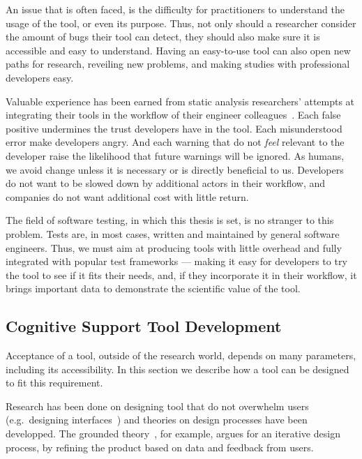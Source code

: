 \documentclass[a4paper,11pt]{sdm_internship}
\theoremstyle{definition}
\begin{document}
An issue that is often faced, is the difficulty for practitioners to understand the usage of the tool, or even its purpose.
Thus, not only should a researcher consider the amount of bugs their tool can detect, they should also make sure it is accessible and easy to understand.
Having an easy-to-use tool can also open new paths for research, reveiling new problems, and making studies with professional developers easy.

Valuable experience has been earned from static analysis researchers' attempts at integrating their tools in the workflow of their engineer colleagues~\cite{bessey2010few,sadowski2015tricorder,sadowski2018lessons}.
Each false positive undermines the trust developers have in the tool.
Each misunderstood error make developers angry.
And each warning that do not \emph{feel} relevant to the developer raise the likelihood that future warnings will be ignored.
As humans, we avoid change unless it is necessary or is directly beneficial to us.
Developers do not want to be slowed down by additional actors in their workflow, and companies do not want additional cost with little return.

The field of software testing, in which this thesis is set, is no stranger to this problem.
Tests are, in most cases, written and maintained by general software engineers.
Thus, we must aim at producing tools with little overhead and fully integrated with popular test frameworks --- making it easy for developers to try the tool to see if it fits their needs, and, if they incorporate it in their workflow, it brings important data to demonstrate the scientific value of the tool.

\subsection{Cognitive Support Tool Development}%
\label{ssec:cognitive_support}
Acceptance of a tool, outside of the research world, depends on many parameters, including its accessibility.
In this section we describe how a tool can be designed to fit this requirement.

Research has been done on designing tool that do not overwhelm users (e.g.\ designing interfaces~\cite{oviatt2006human}) and theories on design processes have been developped.
The grounded theory~\cite{stol2016grounded}, for example, argues for an iterative design process, by refining the product based on data and feedback from users.
\end{document}
